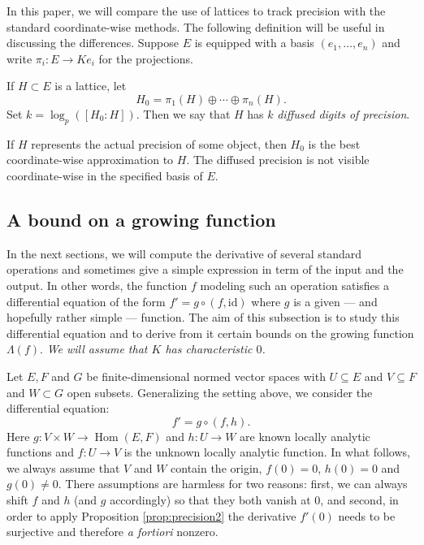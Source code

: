 \documentclass{sig-alternate}
\DeclareMathOperator{\Hom}{Hom}
\newcommand{\id}{\textrm{id}}
\begin{document}
In this paper, we will compare the use of lattices to track precision
with the standard coordinate-wise methods.  The following definition
will be useful in discussing the differences.  Suppose $E$ is equipped
with a basis $(e_1, \ldots, e_n)$ and write $\pi_i : E \to Ke_i$ for the projections.

\begin{deftn} \label{def:diffused}
If $H \subset E$ is a lattice, let
\[
H_0 = \pi_1(H) \oplus \cdots \oplus \pi_n(H).
\]
Set $k = \log_p([H_0 : H])$.  Then we say that $H$ has $k$
\emph{diffused digits of precision}.
\end{deftn}
If $H$ represents the actual precision of some object, then
$H_0$ is the best coordinate-wise approximation to $H$.
The diffused precision is not visible coordinate-wise in the
specified basis of $E$.

\subsection{A bound on a growing function}
\label{ssec:boundLambdaf}

In the next sections, we will compute the derivative of several standard 
operations and sometimes give a simple expression in term 
of the input and the output. In other words, the function $f$ modeling
such an operation satisfies a differential equation of the form
$f' = g \circ (f, \id)$  %
where $g$ is a given --- and hopefully rather simple --- function. The 
aim of this subsection is to study this differential equation and to 
derive from it certain bounds on the growing function $\Lambda(f)$. 
\emph{We will assume that $K$ has 
characteristic $0$.}

Let $E, F$ and $G$ be finite-dimensional normed vector spaces with
$U \subseteq E$ and $V \subseteq F$ and $W \subset G$ open subsets.
Generalizing the setting above, we consider the 
differential equation:
\begin{equation}
\label{eq:diffequah}
f' = g \circ (f, h).
\end{equation}
Here $g : V \times W \to \Hom(E, F)$ and $h : U \to W$ are known
locally analytic functions and $f : U \to V$ is the 
unknown locally analytic function. 
In what follows, we always assume that $V$ and $W$ contain the origin, 
$f(0) = 0$, $h(0) = 0$ and $g(0) \neq 0$. There assumptions are harmless 
for two reasons: first, we can always shift $f$ and $h$ (and $g$ 
accordingly) so that they both vanish at $0$, and second, in order to 
apply Proposition \ref{prop:precision2} the derivative $f'(0)$ 
needs to be surjective and therefore \emph{a fortiori} nonzero.
\end{document}
